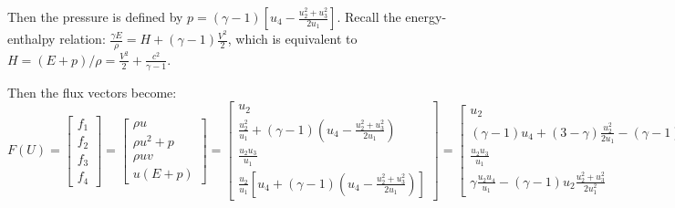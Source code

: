 \documentclass{article}
\begin{document}
Then the pressure is defined by $p=(\gamma-1)[u_4-\frac{u_2^2+u_3^2}{2u_1} ]$.
Recall the energy-enthalpy relation: $\frac{\gamma E}{\rho} = H+(\gamma-1)\frac{V^2}{2}$, which is equivalent to $H = (E+p)/\rho = \frac{V^2}{2}+\frac{c^2}{\gamma-1}$.

Then the flux vectors become:
\begin{equation}
  F(U) = \left[
    \begin{array}{c}
      f_1 \\
      f_2 \\
      f_3 \\
      f_4
    \end{array}
  \right] = \left[
    \begin{array}{c}
      \rho u\\
      \rho u^2 + p\\
      \rho u v\\
      u(E+p)
    \end{array}
  \right] = \left[
    \begin{array}{c}
      u_2\\
      \frac{u_2^2}{u_1} + (\gamma-1) (u_4-\frac{u_2^2+u_3^2}{2u_1})\\
      \frac{u_2 u_3}{u_1}\\
      \frac{u_2}{u_1} [ u_4 + (\gamma-1)(u_4-\frac{u_2^2+u_3^2}{2u_1}) ]
    \end{array}
  \right] = \left[
    \begin{array}{c}
      u_2\\
      (\gamma-1)u_4 + (3-\gamma)\frac{u_2^2}{2u_1} - (\gamma-1)\frac{u_3^2}{2u_1}\\
      \frac{u_2 u_3}{u_1}\\
      \gamma \frac{u_2 u_4}{u_1} - (\gamma-1) u_2 \frac{u_2^2+u_3^2}{2 u_1^2}
    \end{array}
  \right]
\end{equation}
\end{document}
